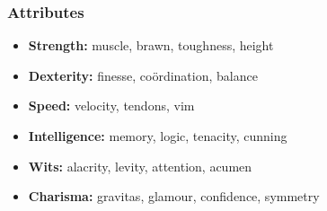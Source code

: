 \subsubsection{Attributes}

\begin{itemize}
  \item
  \textbf{Strength:} muscle, brawn, toughness, height
  \item
  \textbf{Dexterity:} finesse, coördination, balance
  \item
  \textbf{Speed:} velocity, tendons, vim
  \item
  \textbf{Intelligence:} memory, logic, tenacity, cunning
  \item
  \textbf{Wits:} alacrity, levity, attention, acumen
  \item
  \textbf{Charisma:} gravitas, glamour, confidence, symmetry
\end{itemize}


